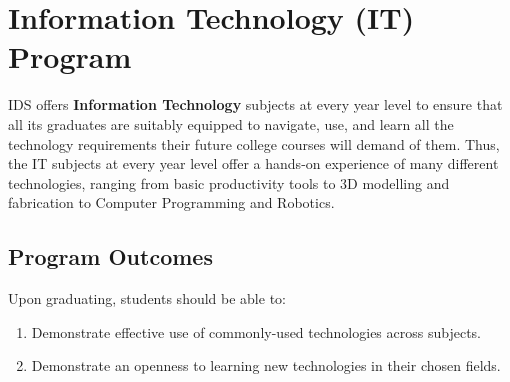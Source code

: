 \section{Information Technology (IT) Program}
IDS offers \textbf{Information Technology} subjects at every year level to ensure that all its graduates are suitably equipped to navigate, use, and learn all the technology requirements their future college courses will demand of them. Thus, the IT subjects at every year level offer a hands-on experience of many different technologies, ranging from basic productivity tools to 3D modelling and fabrication to Computer Programming and Robotics.

\subsection{Program Outcomes}
Upon graduating, students should be able to:
\begin{enumerate}
	\item{Demonstrate effective use of commonly-used technologies across subjects.}
	\item{Demonstrate an openness to learning new technologies in their chosen fields.}

\end{enumerate}
